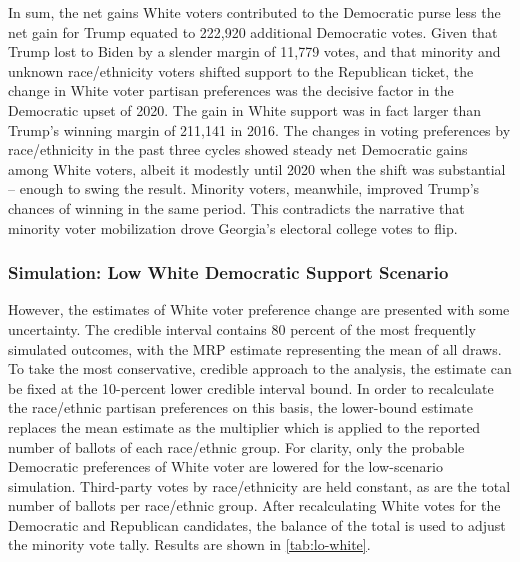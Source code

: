 In sum, the net gains White voters contributed to the Democratic purse less the net gain for Trump equated to 222,920 additional Democratic votes. Given that Trump lost to Biden by a slender margin of 11,779 votes, and that minority and unknown race/ethnicity voters shifted support to the Republican ticket, the change in White voter partisan preferences was the decisive factor in the Democratic upset of 2020. The gain in White support was in fact larger than Trump's winning margin of 211,141 in 2016. The changes in voting preferences by race/ethnicity in the past three cycles showed steady net Democratic gains among White voters, albeit it modestly until 2020 when the shift was substantial -- enough to swing the result. Minority voters, meanwhile, improved Trump's chances of winning in the same period. This contradicts the narrative that minority voter mobilization drove Georgia's electoral college votes to flip. 

\subsubsection{Simulation: Low White Democratic Support Scenario}


However, the estimates of White voter preference change are presented with some uncertainty. The credible interval contains 80 percent of the most frequently simulated outcomes, with the MRP estimate representing the mean of all draws. To take the most conservative, credible approach to the analysis, the estimate can be fixed at the 10-percent lower credible interval bound. In order to recalculate the race/ethnic partisan preferences on this basis, the lower-bound estimate replaces the mean estimate as the multiplier which is applied to the reported number of ballots of each race/ethnic group. For clarity, only the probable Democratic preferences of White voter are lowered for the low-scenario simulation. Third-party votes by race/ethnicity are held constant, as are the total number of ballots per race/ethnic group. After recalculating White votes for the Democratic and Republican candidates, the balance of the total is used to adjust the minority vote tally. Results are shown in \ref{tab:lo-white}.        




